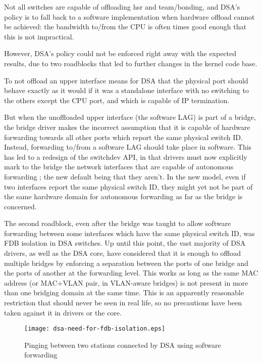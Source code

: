 \documentclass[letterpaper]{article}
\begin{document}
Not all switches are capable of offloading hsr and team/bonding, and DSA's
policy is to fall back to a software implementation when hardware offload
cannot be achieved: the bandwidth to/from the CPU is often times good enough
that this is not impractical.

However, DSA's policy could not be enforced right away with the expected
results, due to two roadblocks that led to further changes in the kernel code
base.

To not offload an upper interface means for DSA that the physical port should
behave exactly as it would if it was a standalone interface with no switching
to the others except the CPU port, and which is capable of IP termination.

But when the unoffloaded upper interface (the software LAG) is part of a
bridge, the bridge driver makes the incorrect assumption that it is capable of
hardware forwarding towards all other ports which report the same physical
switch ID. Instead, forwarding to/from a software LAG should take place in
software. This has led to a redesign of the switchdev API, in that drivers must
now explicitly mark to the bridge the network interfaces that are capable of
autonomous forwarding \cite{switchdev-explicit-offloading-api}; the new default
being that they aren't. In the new model, even if two interfaces report the
same physical switch ID, they might yet not be part of the same hardware domain
for autonomous forwarding as far as the bridge is concerned.

The second roadblock, even after the bridge was taught to allow software
forwarding between some interfaces which have the same physical switch ID, was
FDB isolation in DSA switches. Up until this point, the vast majority of DSA
drivers, as well as the DSA core, have considered that it is enough to offload
multiple bridges by enforcing a separation between the ports of one bridge and
the ports of another at the forwarding level. This works as long as the same
MAC address (or MAC+VLAN pair, in VLAN-aware bridges) is not present in more
than one bridging domain at the same time. This is an apparently reasonable
restriction that should never be seen in real life, so no precautions have been
taken against it in drivers or the core.

\begin{figure}[ht]
  \centering
  \texttt{[image: dsa-need-for-fdb-isolation.eps]}
  \caption{Pinging between two stations connected by DSA using software forwarding}
  \label{dsa-need-for-fdb-isolation}
\end{figure}
\end{document}
